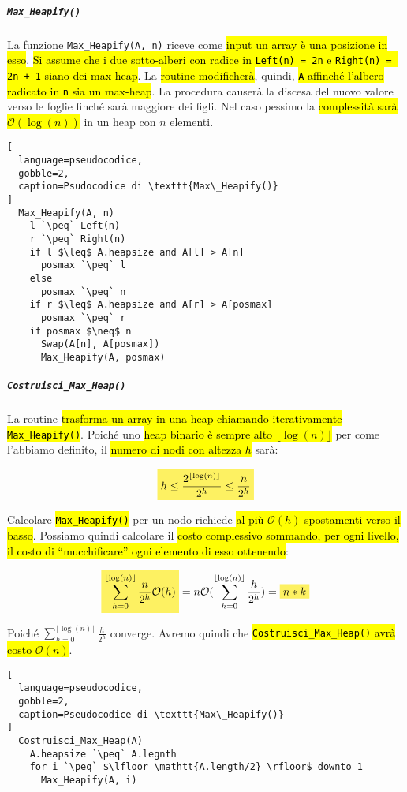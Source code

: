 \documentclass[a4paper,11pt,twoside]{article}
\theoremstyle{plain}
\theoremstyle{definition}
\theoremstyle{remark}
\newcommand{\mhl}[1]{\colorbox{hlcolor}{$\displaystyle #1$}}
\newcommand{\peq}{$\gets$}
\begin{document}
\subparagraph{\texttt{Max\_Heapify()}} La funzione \texttt{Max\_Heapify(A, n)}
riceve come \hl{input un array è una posizione in esso}. \hl{Si assume che i due
sotto-alberi con radice in \texttt{Left(n) = 2n} e \texttt{Right(n) = 2n + 1}
siano dei max-heap}. La \hl{routine modificherà}, quindi, \hl{\texttt{A}
affinché l'albero radicato in \texttt{n} sia un max-heap}. La procedura causerà
la discesa del nuovo valore verso le foglie finché sarà maggiore dei figli. Nel
caso pessimo la \hl{complessità sarà $\mathcal{O}(\log(n))$} in un heap con $n$
elementi.

\begin{lstlisting}[
  language=pseudocodice,
  gobble=2,
  caption=Psudocodice di \texttt{Max\_Heapify()}
]
  Max_Heapify(A, n)
    l `\peq` Left(n)
    r `\peq` Right(n)
    if l $\leq$ A.heapsize and A[l] > A[n]
      posmax `\peq` l
    else
      posmax `\peq` n
    if r $\leq$ A.heapsize and A[r] > A[posmax]
      posmax `\peq` r
    if posmax $\neq$ n
      Swap(A[n], A[posmax])
      Max_Heapify(A, posmax)
\end{lstlisting}

\subparagraph{\texttt{Costruisci\_Max\_Heap()}} La routine \hl{trasforma un
array in una heap chiamando iterativamente \texttt{Max\_Heapify()}}. Poiché uno
\hl{heap binario è sempre alto $\lfloor \log(n) \rfloor$} per come l'abbiamo
definito, il \hl{numero di nodi con altezza $h$} sarà:

\begin{equation}
  \mhl{
    h \leq \frac{2^{\lfloor \log(n) \rfloor}}{2^h} \leq \frac{n}{2^h}
  }
\end{equation}

\noindent Calcolare \hl{\texttt{Max\_Heapify()}} per un nodo richiede \hl{al più
$\mathcal{O}(h)$ spostamenti verso il basso}. Possiamo quindi calcolare il
\hl{costo complessivo sommando, per ogni livello, il costo di ``mucchificare''
ogni elemento di esso ottenendo}:

\begin{equation}
  \mhl{ \sum_{h = 0}^{\lfloor \log(n) \rfloor} \frac{n}{2^h}\mathcal{O}(h) } =
    n\mathcal{O}(\sum_{h = 0}^{\lfloor \log(n) \rfloor} \frac{h}{2^h}) =
    \mhl{ n * k }
\end{equation}

\noindent Poiché $\sum_{h = 0}^{\lfloor \log(n) \rfloor} \frac{h}{2^h}$
converge. Avremo quindi che \hl{\texttt{Costruisci\_Max\_Heap()} avrà costo
$\mathcal{O}(n)$}.

\begin{lstlisting}[
  language=pseudocodice,
  gobble=2,
  caption=Pseudocodice di \texttt{Max\_Heapify()}
]
  Costruisci_Max_Heap(A)
    A.heapsize `\peq` A.legnth
    for i `\peq` $\lfloor \mathtt{A.length/2} \rfloor$ downto 1
      Max_Heapify(A, i)
\end{lstlisting}
\end{document}
